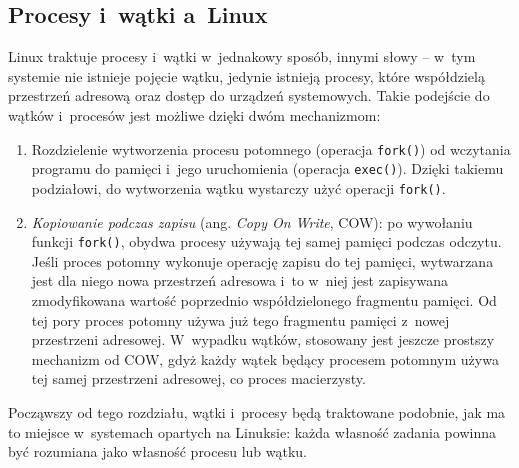 \documentclass[12pt]{mwart}
\newcommand{\code}{\texttt}
\newcommand{\procbr}{()}
\newcommand{\function}[1]{\code{#1\procbr}}
\begin{document}
\subsection{Procesy i~wątki a~Linux}
\indent
  Linux traktuje procesy i~wątki w~jednakowy sposób, innymi słowy -- w~tym systemie nie istnieje pojęcie wątku, jedynie istnieją procesy, które
  współdzielą przestrzeń adresową oraz dostęp do urządzeń systemowych.
  Takie podejście do wątków i~procesów jest możliwe dzięki dwóm mechanizmom:
  \begin{enumerate}
    \item Rozdzielenie wytworzenia procesu potomnego (operacja \function{fork}) od wczytania programu do pamięci i~jego uruchomienia (operacja \function{exec}).
    Dzięki takiemu podziałowi, do wytworzenia wątku wystarczy użyć operacji \function{fork}.
    \item \emph{Kopiowanie podczas zapisu} (ang. \emph{Copy On Write}, COW): po wywołaniu funkcji \function{fork}, obydwa procesy używają
    tej samej pamięci podczas odczytu. Jeśli proces potomny wykonuje operację zapisu do tej pamięci, wytwarzana jest dla niego nowa przestrzeń adresowa
    i~to w~niej jest zapisywana zmodyfikowana wartość poprzednio współdzielonego fragmentu pamięci. Od tej pory proces potomny używa już tego fragmentu pamięci 
    z~nowej przestrzeni adresowej. W~wypadku wątków, stosowany jest jeszcze prostszy mechanizm od COW, gdyż każdy wątek będący procesem potomnym używa tej samej
    przestrzeni adresowej, co proces macierzysty.
  \end{enumerate}
  Począwszy od tego rozdziału, wątki i~procesy będą traktowane podobnie, jak ma to miejsce w~systemach opartych na Linuksie: każda własność zadania powinna być
  rozumiana jako własność procesu lub wątku.
\par
%
\end{document}
